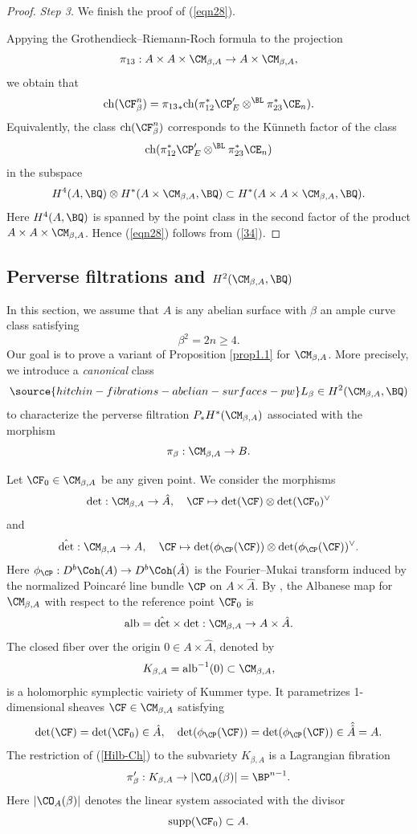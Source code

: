 \begin{proof}
 \emph{Step 3.} We finish the proof of (\ref{eqn28}).

Appying the Grothendieck--Riemann-Roch formula to the projection
\[
\pi_{13}: A \times A \times \CM_{\beta, A} \to A \times \CM_{\beta,A},
\]
we obtain that
\[
\mathrm{ch}(\CF^n_\beta) = {\pi_{13}}_\ast \mathrm{ch}(\pi_{12}^\ast {\CP'_{E}} \otimes^{\BL} \pi_{23}^\ast \CE_n).
\]
Equivalently, the class $\mathrm{ch}(\CF^n_\beta)$ corresponds to the K\"unneth factor of the class
\[
\mathrm{ch}(\pi_{12}^\ast {\CP'_{E}} \otimes^{\BL} \pi_{23}^\ast \CE_n)
\]
in the subspace
\[
H^4(A, \BQ) \otimes H^*(A \times \CM_{\beta,A}, \BQ) \subset H^*(A\times A \times \CM_{\beta, A}, \BQ).
\]
Here $H^4(A, \BQ)$ is spanned by the point class in the second factor of the product $A \times A \times \CM_{\beta, A}$. Hence (\ref{eqn28}) follows from (\ref{34}).
\end{proof}


\subsection{Perverse filtrations and $H^2(\CM_{\beta,A}, \BQ)$}
In this section, we assume that $A$ is any abelian surface with $\beta$ an ample curve class satisfying \[\beta^2= 2n \geq 4.\] Our goal is to prove a variant of Proposition \ref{prop1.1} for $\CM_{\beta,A}$.  More precisely, we introduce a \emph{canonical} class
 \begin{equation}\label{ample_base}
\source{hitchin-fibrations-abelian-surfaces-pw}
 L_\beta \in H^2(\CM_{\beta,A} ,\BQ)
 \end{equation}
to characterize the perverse filtration $P_{\ast} H^*(\CM_{\beta, A})$ associated with the morphism
\[
\pi_\beta: \CM_{\beta, A} \to B.
\]


Let $\CF_0 \in \CM_{\beta, A}$ be any given point. We consider the morphisms
\[
\mathrm{det}: \CM_{\beta,A} \to \hat{A}, \quad \CF \mapsto \mathrm{det}(\CF)\otimes \mathrm{det}(\CF_0)^\vee
\]
and
\[
\hat{\mathrm{det}}: \CM_{\beta,A} \to A, \quad \CF \mapsto \mathrm{det}(\phi_\CP(\CF)) \otimes \mathrm{det}(\phi_\CP(\CF))^\vee.
\]
Here $\phi_\CP : D^b\Coh(A) \to D^b\Coh(\hat{A})$ is the Fourier--Mukai transform induced by the normalized Poincar\'e line bundle $\CP$ on $A \times \hat{A}$. By \cite{Yo}, the Albanese map for $\CM_{\beta,A}$ with respect to the reference point $\CF_0$ is
\[
\mathrm{alb} = \hat{\mathrm{det}} \times \mathrm{det}: \CM_{\beta,A} \to A \times \hat{A}.
\]
The closed fiber over the origin $0 \in A\times \hat{A}$, denoted by
\[
K_{\beta,A} = \mathrm{alb}^{-1}(0) \subset \CM_{\beta, A},
\]
is a holomorphic symplectic vairiety of Kummer type. It parametrizes 1-dimensional sheaves $\CF \in \CM_{\beta,A}$ satisfying
\[
 \mathrm{det}(\CF)= \mathrm{det}(\CF_0) \in \hat{A},\quad   \mathrm{det}(\phi_\CP(\CF)) = \mathrm{det}(\phi_\CP(\CF)) \in \hat{\hat{A}} = A.
\]
The restriction of (\ref{Hilb-Ch}) to the subvariety $K_{\beta, A}$ is a Lagrangian fibration
\[
\pi'_\beta: K_{\beta, A} \to  |\CO_A(\beta)| =  \BP^{n-1}.
\]
Here $ |\CO_A(\beta)|$ denotes the linear system associated with the divisor \[
\mathrm{supp}(\CF_0) \subset A.
\]

